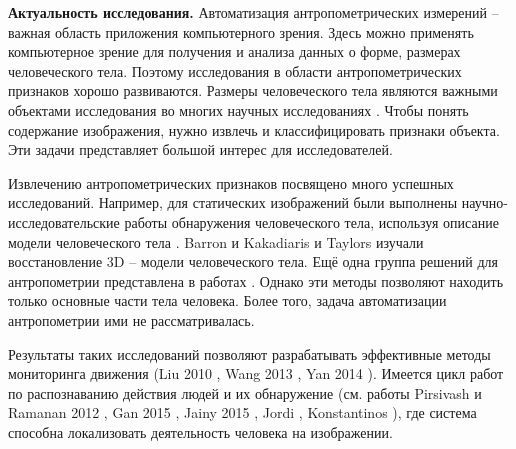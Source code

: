 
\textbf{Актуальность исследования.}
Автоматизация антропометрических измерений  -- важная область приложения компьютерного зрения. Здесь можно применять компьютерное зрение для получения и анализа данных о форме, размерах человеческого тела. Поэтому исследования в области антропометрических признаков хорошо развиваются. Размеры человеческого тела являются важными объектами исследования во многих научных исследованиях \cite{Paul2011,Michaell2011,Wuhre2014}. Чтобы понять содержание изображения, нужно извлечь и классифицировать признаки объекта. Эти задачи представляет большой интерес для исследователей.

Извлечению антропометрических признаков посвящено много успешных исследований. Например, для статических изображений были выполнены научно-исследовательские работы обнаружения человеческого тела, используя описание модели человеческого тела \cite{YuChen2011, Albio2001}. Barron и Kakadiaris \cite{Barron2000} и Taylors \cite{Taylor2000} изучали восстановление 3D – модели человеческого тела. Ещё одна группа решений для антропометрии представлена в работах \cite{Micilotta2005, Mikolajczyk2004, Robert2004, Ronfard2002}. Однако эти методы позволяют находить только основные части тела человека. Более того, задача автоматизации антропометрии ими не рассматривалась.

Результаты таких исследований позволяют разрабатывать эффективные методы мониторинга движения (Liu 2010 \cite{Liu2010}, Wang  2013 \cite{Wang2013},  Yan 2014 \cite{Yan2014}). Имеется цикл работ по распознаванию действия людей и их обнаружение (см. работы Pirsivash и Ramanan  2012 \cite{Pirsiavash2012}, Gan 2015 \cite{Gan2015}, Jainy 2015 \cite{Jainy2015}, Jordi \cite{Jordi2012}, Konstantinos \cite{Konstantinos2016}), где система способна локализовать деятельность человека на изображении.

